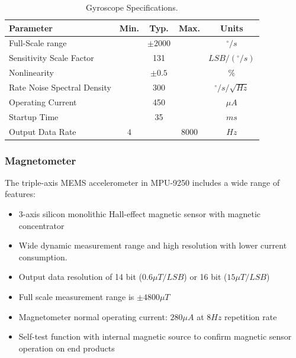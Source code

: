 \begin{table}[H]
    \begin{center}
        \begin{tabular}[t]{lcccc}
            \hline
            Parameter                   & Min. & Typ.       & Max.   & Units                  \\
            \hline
            Full-Scale range            &      & $\pm 2000$ &        & $^{\circ}/s$           \\
            Sensitivity Scale Factor    &      & 131        &        & $LSB/(^{\circ}/s)$     \\
            Nonlinearity                &      & $\pm 0.5$  &        & $\%$                   \\
            Rate Noise Spectral Density &      & 300        &        & $^{\circ}/s/\sqrt{Hz}$ \\
            Operating Current           &      & 450        &        & $\mu A$                \\
            Startup Time                &      & 35         &        & $ms$                   \\
            Output Data Rate            & $4$  &            & $8000$ & $Hz$                   \\
            \hline
        \end{tabular}
        \caption{Gyroscope Specifications. }
        \label{tab:gyroscope_specification}
    \end{center}
\end{table}

\subsubsection{Magnetometer}

The triple-axis MEMS accelerometer in MPU-9250 includes a wide range of features:
\begin{itemize}
    \item 3-axis silicon monolithic Hall-effect magnetic sensor with magnetic concentrator
    \item Wide dynamic measurement range and high resolution with lower current consumption.
    \item Output data resolution of 14 bit ($0.6 \mu T/LSB$) or 16 bit ($15 \mu T/LSB$)
    \item Full scale measurement range is $\pm 4800 \mu T$
    \item Magnetometer normal operating current: $280\mu A$ at $8 Hz$ repetition rate
    \item Self-test function with internal magnetic source to confirm magnetic sensor operation on end products
\end{itemize}

